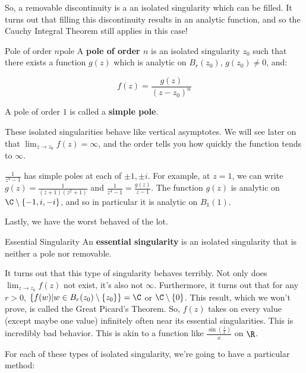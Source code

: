 So, a removable discontinuity is a an isolated singularity which can be filled. It turns out that filling this discontinuity results in an analytic function, and so the Cauchy Integral Theorem still applies in this case!

\begin{defbo}{Pole of order $n$}{pole} A {\bf pole of order $n$} is an isolated singularity $z_0$ such that there exists a function $g(z)$ which is analytic on $B_r(z_0)$, $g(z_0)\ne 0$, and:

$$f(z) = \frac{g(z)}{(z-z_0)^n}$$

A pole of order $1$ is called a {\bf simple pole}.
\end{defbo}

These isolated singularities behave like vertical asymptotes. We will see later on that $\lim_{z\rightarrow z_0}f(z) = \infty$, and the order tells you how quickly the function tends to $\infty$.

\begin{ex}{}{}$\frac{1}{z^4 - 1}$ has simple poles at each of $\pm1, \pm i$. For example, at $z = 1$, we can write $g(z) = \frac{1}{(z+1)(z^2 + 1)}$ and $\frac{1}{z^4 - 1} = \frac{g(z)}{z-1}$. The function $g(z)$ is analytic on $\C\setminus \{-1,i,-i\}$, and so in particular it is analytic on $B_1(1)$.
\end{ex}

Lastly, we have the worst behaved of the lot.

\begin{defbo}{Essential Singularity}{} An {\bf essential singularity} is an isolated singularity that is neither a pole nor removable.\end{defbo}

It turns out that this type of singularity behaves terribly. Not only does $\lim_{z\rightarrow z_0}f(z)$ not exist, it's also not $\infty$. Furthermore, it turns out that for any $r > 0$, $\{f(w)|w\in B_r(z_0)\setminus\{z_0\}\} = \C$ or $\C\setminus\{0\}$. This result, which we won't prove, is called the Great Picard's Theorem. So, $f(z)$ takes on every value (except maybe one value) infinitely often near its essential singularities. This is incredibly bad behavior. This is akin to a function like $\frac{\sin\left(\frac{1}{x}\right)}{x}$ on $\R$.

For each of these types of isolated singularity, we're going to have a particular method:

